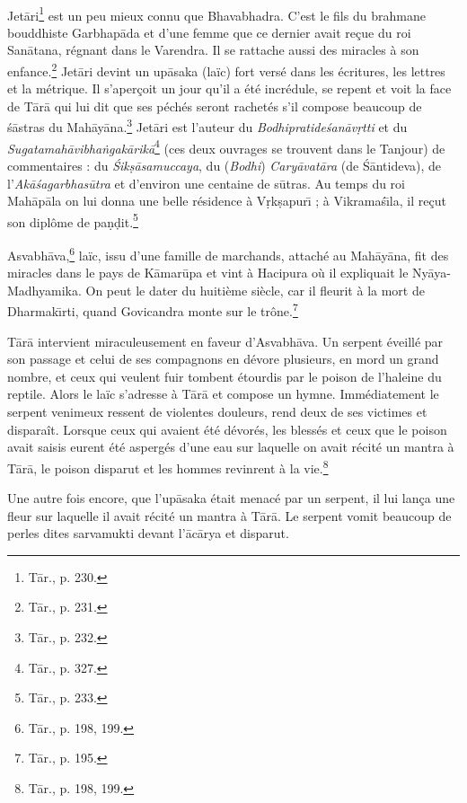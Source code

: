 \documentclass[a4paper, 11pt, oneside, french, landscape, twocolumn]{article}
\begin{document}
\paragraph{}
Jet\={a}ri\footnote{T\={a}r., p. 230.} est un peu mieux connu que Bhavabhadra. C'est le fils du brahmane bouddhiste Garbhap\={a}da et d'une femme que ce dernier avait reçue du roi San\={a}tana, régnant dans le Varendra. Il se rattache aussi des miracles à son enfance.\footnote{T\={a}r., p. 231.} Jet\={a}ri devint un up\={a}saka (laïc) fort versé dans les écritures, les lettres et la métrique. Il s'aperçoit un jour qu'il a été incrédule, se repent et voit la face de T\={a}r\={a} qui lui dit que ses péchés seront rachetés s'il compose beaucoup de \'{s}\={a}stras du Mah\={a}y\={a}na.\footnote{T\={a}r., p. 232.} Jet\={a}ri est l'auteur du \emph{Bodhipratide\'{s}an\={a}v\d{r}tti} et du \emph{Sugatamah\={a}vibha\.{n}gak\={a}rik\={a}}\footnote{T\={a}r., p. 327.} (ces deux ouvrages se trouvent dans le Tanjour) de commentaires : du \emph{\'{S}ik\d{s}\={a}samuccaya}, du (\emph{Bodhi}) \emph{Cary\={a}vat\={a}ra} (de \'{S}\={a}ntideva), de l'\emph{Ak\={a}\'{s}agarbhas\={u}tra} et d'environ une centaine de s\={u}tras. Au temps du roi Mah\={a}p\={a}la on lui donna une belle résidence à V\d{r}k\d{s}apur\={\i} ; à Vikrama\'{s}\={\i}la, il reçut son diplôme de pa\d{n}\d{d}it.\footnote{T\={a}r., p. 233.}

Asvabh\={a}va,\footnote{T\={a}r., p. 198, 199.} laïc, issu d'une famille de marchands, attaché au Mah\={a}y\={a}na, fit des miracles dans le pays de K\={a}mar\={u}pa et vint à Hacipura où il expliquait le Ny\={a}ya-Madhyamika. On peut le dater du huitième siècle, car il fleurit à la mort de Dharmak\={\i}rti, quand Govicandra monte sur le trône.\footnote{T\={a}r., p. 195.}

T\={a}r\={a} intervient miraculeusement en faveur d'Asvabh\={a}va. Un serpent éveillé par son passage et celui de ses compagnons en dévore plusieurs, en mord un grand nombre, et ceux qui veulent fuir tombent étourdis par le poison de l'haleine du reptile. Alors le laïc s'adresse à T\={a}r\={a} et compose un hymne. Immédiatement le serpent venimeux ressent de violentes douleurs, rend deux de ses victimes et disparaît. Lorsque ceux qui avaient été dévorés, les blessés et ceux que le poison avait saisis eurent été aspergés d'une eau sur laquelle on avait récité un mantra à T\={a}r\={a}, le poison disparut et les hommes revinrent à la vie.\footnote{T\={a}r., p. 198, 199.}

Une autre fois encore, que l'up\={a}saka était menacé par un serpent, il lui lança une fleur sur laquelle il avait récité un mantra à T\={a}r\={a}. Le serpent vomit beaucoup de perles dites sarvamukti devant l'\={a}c\={a}rya et disparut.
\end{document}

